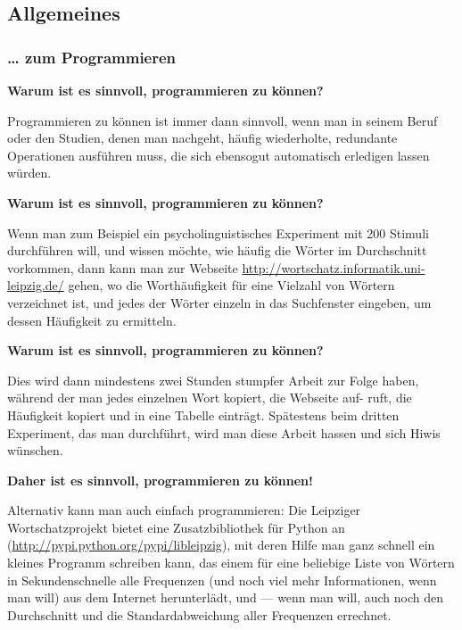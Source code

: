 \subsection{Allgemeines}

\subsubsection{\texorpdfstring{{\ldots{} zum
Programmieren}}{\ldots{} zum Programmieren}}

\par\noindent\textbf{Warum ist es sinnvoll, programmieren zu können?}

{Programmieren zu können ist immer dann sinnvoll, wenn man in seinem
Beruf oder den Studien, denen man nachgeht, häufig wiederholte,
redundante Operationen ausführen muss, die sich ebensogut automatisch
erledigen lassen würden.}



\par\noindent\textbf{Warum ist es sinnvoll, programmieren zu können?}

Wenn man zum Beispiel ein psycholinguistisches Experiment mit 200
Stimuli durchführen will, und wissen möchte, wie häufig die Wörter im
Durchschnitt vorkommen, dann kann man zur Webseite
\url{http://wortschatz.informatik.uni-leipzig.de/} gehen, wo die
Worthäufigkeit für eine Vielzahl von Wörtern verzeichnet ist, und jedes
der Wörter einzeln in das Suchfenster eingeben, um dessen Häufigkeit zu
ermitteln.



\par\noindent\textbf{Warum ist es sinnvoll, programmieren zu können?}

Dies wird dann mindestens zwei Stunden stumpfer Arbeit zur Folge haben,
während der man jedes einzelnen Wort kopiert, die Webseite auf- ruft,
die Häufigkeit kopiert und in eine Tabelle einträgt. Spätestens beim
dritten Experiment, das man durchführt, wird man diese Arbeit hassen und
sich Hiwis wünschen.



\par\noindent\textbf{Daher ist es sinnvoll, programmieren zu können!}

Alternativ kann man auch einfach programmieren: Die Leipziger
Wortschatzprojekt bietet eine Zusatzbibliothek für Python an
(\url{http://pypi.python.org/pypi/libleipzig}), mit deren Hilfe man ganz
schnell ein kleines Programm schreiben kann, das einem für eine
beliebige Liste von Wörtern in Sekundenschnelle alle Frequenzen (und
noch viel mehr Informationen, wenn man will) aus dem Internet
herunterlädt, und --- wenn man will, auch noch den Durchschnitt und die
Standardabweichung aller Frequenzen errechnet.



